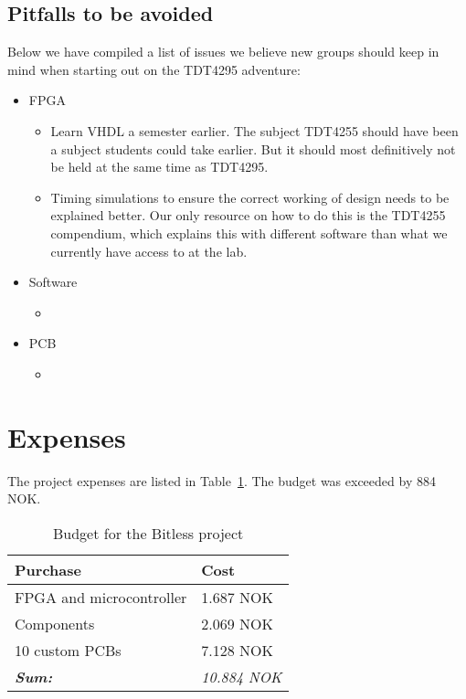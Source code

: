 \subsection{Pitfalls to be avoided}\label{conclusion:pitfalls}
Below we have compiled a list of issues we believe new groups should keep in mind when starting out on the TDT4295 adventure:
\begin{itemize}
	\item FPGA
	\begin{itemize}
		\item Learn VHDL a semester earlier. The subject TDT4255 should have been a subject students could take earlier.
But it should most definitively not be held at the same time as TDT4295.
		\item Timing simulations to ensure the correct working of design needs to be explained better.
Our only resource on how to do this is the TDT4255 compendium\cite{tdt4255-compendium}, which explains this with different software than what we currently have access to at the lab.
	\end{itemize}
	\item Software
	\begin{itemize}
		\item
	\end{itemize}
	\item PCB
	\begin{itemize}
		\item
	\end{itemize}
\end{itemize}

\section{Expenses}
The project expenses are listed in Table~\ref{tab:budget}. The budget was exceeded by 884 NOK.

\begin{table}[H]
	\centering
	\begin{tabular}{|l|l|}
		\hline
		\textbf{Purchase} & \textbf{Cost} \\
		\hline
		\hline
		FPGA and microcontroller & 1.687 NOK\\
		\hline
		Components & 2.069 NOK\\
		\hline
		10 custom PCBs & 7.128 NOK \\
		\hline
		\hline
		\textbf{\textit{Sum:}} & \textit{10.884 NOK}\\
		\hline
	\end{tabular}
	\caption{Budget for the Bitless project}
	\label{tab:budget}
\end{table}
